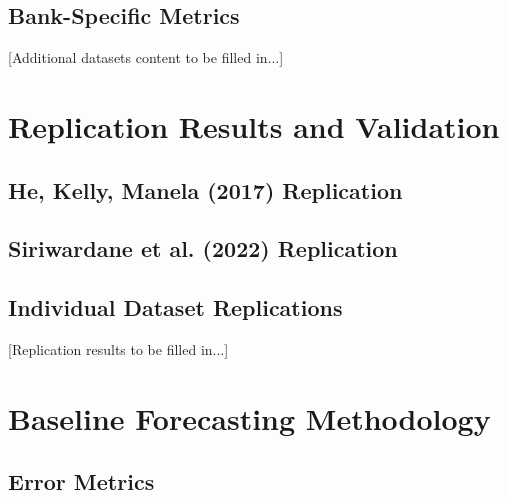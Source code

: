 \documentclass{article}
\begin{document}
\subsection{Bank-Specific Metrics}

[Additional datasets content to be filled in...]

\section{Replication Results and Validation}
\label{sec:replication}


\subsection{He, Kelly, Manela (2017) Replication}

\subsection{Siriwardane et al. (2022) Replication}

\subsection{Individual Dataset Replications}

[Replication results to be filled in...]

\section{Baseline Forecasting Methodology}
\label{sec:methodology}


\subsection{Error Metrics}
\end{document}
